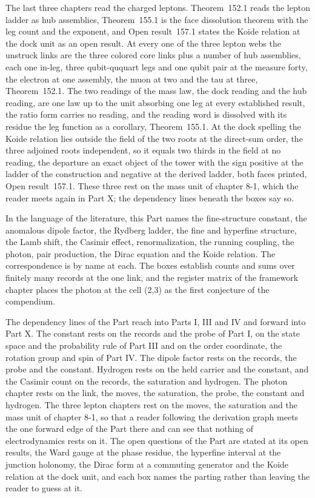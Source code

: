 The last three chapters read the charged leptons. Theorem~152.1 reads the lepton ladder as hub assemblies, Theorem~155.1 is the face dissolution theorem with the leg count and the exponent, and Open result~157.1 states the Koide relation at the dock unit as an open result. At every one of the three lepton webs the unstruck links are the three colored core links plus a number of hub assemblies, each one in-leg, three qubit-ququart legs and one qubit pair at the measure forty, the electron at one assembly, the muon at two and the tau at three, Theorem~152.1. The two readings of the mass law, the dock reading and the hub reading, are one law up to the unit absorbing one leg at every established result, the ratio form carries no reading, and the reading word is dissolved with its residue the leg function as a corollary, Theorem~155.1. At the dock spelling the Koide relation lies outside the field of the two roots at the direct-sum order, the three adjoined roots independent, so it equals two thirds in the field at no reading, the departure an exact object of the tower with the sign positive at the ladder of the construction and negative at the derived ladder, both faces printed, Open result~157.1. These three rest on the mass unit of chapter 8-1, which the reader meets again in Part X; the dependency lines beneath the boxes say so.

In the language of the literature, this Part names the fine-structure constant, the anomalous dipole factor, the Rydberg ladder, the fine and hyperfine structure, the Lamb shift, the Casimir effect, renormalization, the running coupling, the photon, pair production, the Dirac equation and the Koide relation. The correspondence is by name at each. The boxes establish counts and sums over finitely many records at the one link, and the register matrix of the framework chapter places the photon at the cell (2,3) as the first conjecture of the compendium.

The dependency lines of the Part reach into Parts I, III and IV and forward into Part X. The constant rests on the records and the probe of Part I, on the state space and the probability rule of Part III and on the order coordinate, the rotation group and spin of Part IV. The dipole factor rests on the records, the probe and the constant. Hydrogen rests on the held carrier and the constant, and the Casimir count on the records, the saturation and hydrogen. The photon chapter rests on the link, the moves, the saturation, the probe, the constant and hydrogen. The three lepton chapters rest on the moves, the saturation and the mass unit of chapter 8-1, so that a reader following the derivation graph meets the one forward edge of the Part there and can see that nothing of electrodynamics rests on it. The open questions of the Part are stated at its open results, the Ward gauge at the phase residue, the hyperfine interval at the junction holonomy, the Dirac form at a commuting generator and the Koide relation at the dock unit, and each box names the parting rather than leaving the reader to guess at it.
